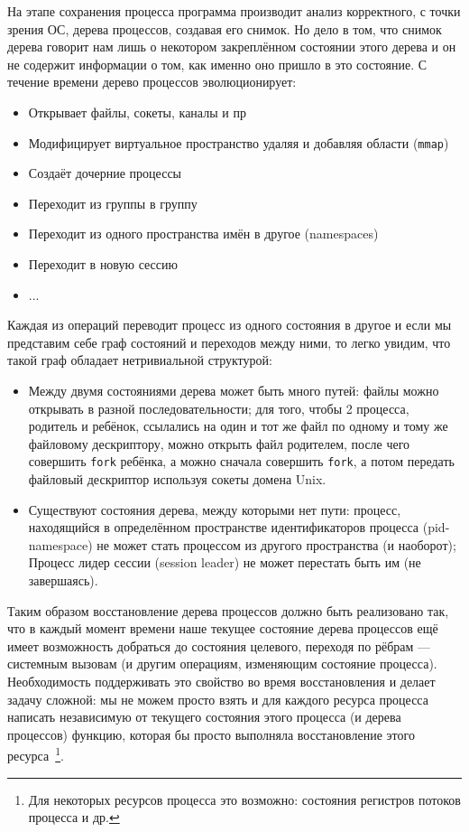 На этапе сохранения процесса программа производит анализ корректного, с точки зрения ОС, дерева процессов, создавая его снимок. Но дело в том, что снимок дерева говорит нам лишь о некотором закреплённом состоянии этого дерева и он не содержит информации о том, как именно оно пришло в это состояние. С течение времени дерево процессов эволюционирует:

\begin{itemize}
    \item Открывает файлы, сокеты, каналы и пр
    \item Модифицирует виртуальное пространство удаляя и добавляя области (\texttt{mmap})
    \item Создаёт дочерние процессы
    \item Переходит из группы в группу
    \item Переходит из одного пространства имён в другое (namespaces)
    \item Переходит в новую сессию
    \item ...
\end{itemize}

Каждая из операций переводит процесс из одного состояния в другое и если мы представим себе граф состояний и переходов
между ними, то легко увидим, что такой граф обладает нетривиальной структурой:

\begin{itemize}
    \item Между двумя состояниями дерева может быть много путей: файлы можно открывать в разной последовательности; для того, чтобы 2 процесса, родитель и ребёнок, ссылались на один и тот же файл по одному и тому же файловому дескриптору, можно открыть файл родителем, после чего совершить \texttt{fork} ребёнка, а можно сначала совершить \texttt{fork}, а потом передать файловый дескриптор используя сокеты домена Unix.

    \item Существуют состояния дерева, между которыми нет пути: процесс, находящийся в определённом пространстве идентификаторов процесса (pid-namespace) не может стать процессом из другого пространства (и наоборот); Процесс лидер сессии (session leader) не может перестать быть им (не завершаясь).
\end{itemize}

Таким образом восстановление дерева процессов должно быть реализовано так, что в каждый момент времени наше текущее состояние дерева процессов ещё имеет возможность добраться до состояния целевого, переходя по рёбрам --- системным вызовам (и другим операциям, изменяющим состояние процесса). Необходимость поддерживать это свойство во время восстановления и делает задачу сложной: мы не можем просто взять и для каждого ресурса процесса написать независимую от текущего состояния этого процесса (и дерева процессов) функцию, которая бы просто выполняла восстановление этого ресурса~\footnote{Для некоторых ресурсов процесса это возможно: состояния регистров потоков процесса и др.}.

